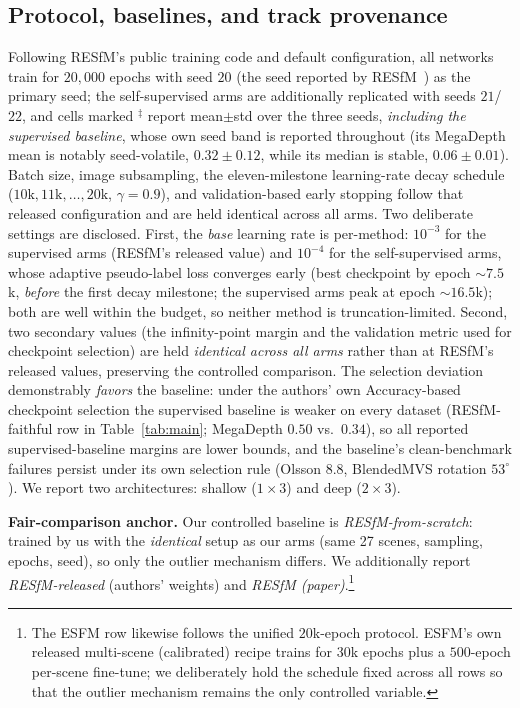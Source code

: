 \documentclass{article}
\renewcommand{\deg}{^{\circ}}
\begin{document}
\subsection{Protocol, baselines, and track provenance}\label{sec:protocol}
Following RESfM's public training code and default configuration, all networks train for
$20{,}000$ epochs with seed $20$ (the seed reported by RESfM~\citep{resfm}) as the primary
seed; the self-supervised arms are additionally replicated with seeds $21$/$22$, and cells
marked $^{\ddagger}$ report mean$\pm$std over the three seeds, \emph{including the
supervised baseline}, whose own seed band is reported throughout (its MegaDepth mean is
notably seed-volatile, $0.32\pm0.12$, while its median is stable, $0.06\pm0.01$). Batch size,
image subsampling, the eleven-milestone learning-rate decay schedule
($10\mathrm{k},11\mathrm{k},\dots,20\mathrm{k}$, $\gamma{=}0.9$), and validation-based
early stopping follow that released configuration and are held identical across all arms.
Two deliberate settings are disclosed. First, the \emph{base} learning rate is per-method:
$10^{-3}$ for the supervised arms (RESfM's released value) and $10^{-4}$ for the
self-supervised arms, whose adaptive pseudo-label loss converges early (best checkpoint by
epoch ${\sim}7.5$k, \emph{before} the first decay milestone; the supervised arms peak at
epoch ${\sim}16.5$k); both are well within the budget, so neither method is
truncation-limited. Second, two secondary values (the infinity-point margin and the
validation metric used for checkpoint selection) are held \emph{identical across all arms}
rather than at RESfM's released values, preserving the controlled comparison. The
selection deviation demonstrably \emph{favors} the baseline: under the authors' own
Accuracy-based checkpoint selection the supervised baseline is weaker on every dataset
(RESfM-faithful row in Table~\ref{tab:main}; MegaDepth $0.50$ vs.\ $0.34$), so all
reported supervised-baseline margins are lower bounds, and the baseline's clean-benchmark
failures persist under its own selection rule (Olsson $8.8$, BlendedMVS rotation
$53\deg$). We report two
architectures: shallow ($1{\times}3$) and deep ($2{\times}3$).

\noindent\textbf{Fair-comparison anchor.} Our controlled baseline is
\emph{RESfM-from-scratch}: trained by us with the \emph{identical} setup as our arms (same
27 scenes, sampling, epochs, seed), so only the outlier mechanism differs. We additionally
report \emph{RESfM-released} (authors' weights) and \emph{RESfM (paper)}.\footnote{The
ESFM row likewise follows the unified $20$k-epoch protocol. ESFM's own released
multi-scene (calibrated) recipe trains for $30$k epochs plus a $500$-epoch per-scene
fine-tune; we deliberately hold the schedule fixed across all rows so that the outlier
mechanism remains the only controlled variable.}
\end{document}
